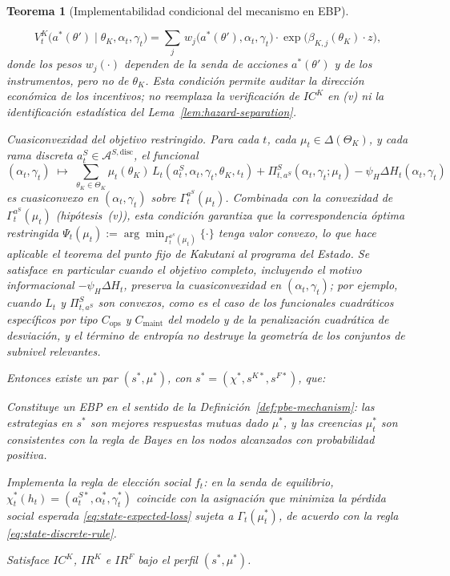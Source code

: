 \documentclass[review,authoryear,12pt]{elsarticle}
\theoremstyle{plain}
\newtheorem{theorem}{Teorema}
\theoremstyle{definition}
\newcommand{\ThetaK}{\Theta_K}
\newcommand{\1}{\mathbf{1}}
\begin{document}
\begin{theorem}[Implementabilidad condicional del mecanismo en EBP]
\begin{list}{}
  \[
    V^K_t\!\bigl(a^\ast(\theta')\mid\theta_K,\alpha_t,\gamma_t\bigr)
    =
    \sum_{j}\,w_j\!\bigl(a^\ast(\theta'),\alpha_t,\gamma_t\bigr)
    \cdot\exp\!\bigl(\beta_{K,j}(\theta_K)\cdot z\bigr),
  \]
  donde los pesos $w_j(\cdot)$ dependen de la senda de acciones $a^\ast(\theta')$ y de los instrumentos, pero no de $\theta_K$. Esta condición permite auditar la dirección económica de los incentivos; no reemplaza la verificación de $IC^K$ en \textup{(v)} ni la identificación estadística del Lema~\ref{lem:hazard-separation}.
  \item[\textup{(vii)}] Cuasiconvexidad del objetivo restringido. Para cada $t$, cada $\mu_t\in\Delta(\ThetaK)$, y cada rama discreta $a_t^S\in\mathcal{A}^{S,\mathrm{disc}}$, el funcional
  \[
  (\alpha_t,\gamma_t)\;\mapsto\;\sum_{\theta_K\in\ThetaK}\mu_t(\theta_K)\,L_t(a_t^S,\alpha_t,\gamma_t,\theta_K,\iota_t)
  +\Pi_{t,a^S}^S(\alpha_t,\gamma_t;\mu_t)
  -\psi_H\Delta H_t(\alpha_t,\gamma_t)
  \]
  es cuasiconvexo en $(\alpha_t,\gamma_t)$ sobre $\Gamma_t^{a^S}(\mu_t)$. Combinada con la convexidad de $\Gamma_t^{a^S}(\mu_t)$ \textup{(}hipótesis~\textup{(v)}\textup{)}, esta condición garantiza que la correspondencia óptima restringida $\Psi_t(\mu_t):=\arg\min_{\Gamma_t^{a^S}(\mu_t)}\{\cdot\}$ tenga valor convexo, lo que hace aplicable el teorema del punto fijo de Kakutani al programa del Estado. Se satisface en particular cuando el objetivo completo, incluyendo el motivo informacional $-\psi_H\Delta H_t$, preserva la cuasiconvexidad en $(\alpha_t,\gamma_t)$; por ejemplo, cuando $L_t$ y $\Pi_{t,a^S}^S$ son convexos, como es el caso de los funcionales cuadráticos específicos por tipo $C_{\mathrm{ops}}$ y $C_{\mathrm{maint}}$ del modelo y de la penalización cuadrática de desviación, y el término de entropía no destruye la geometría de los conjuntos de subnivel relevantes.
\end{list}

Entonces existe un par $(s^\ast,\mu^\ast)$, con $s^\ast=({\chi}^\ast,s^{K\ast},s^{F\ast})$, que:
\begin{list}{}{\setlength{\labelwidth}{2.0em}\setlength{\labelsep}{0.7em}\setlength{\leftmargin}{2.7em}\setlength{\itemindent}{0pt}\setlength{\listparindent}{0pt}\setlength{\parsep}{0pt}\setlength{\itemsep}{0.25\baselineskip}}
    \item[\textup{(a)}] Constituye un EBP en el sentido de la Definición~\ref{def:pbe-mechanism}: las estrategias en $s^\ast$ son mejores respuestas mutuas dado $\mu^\ast$, y las creencias $\mu_t^\ast$ son consistentes con la regla de Bayes en los nodos alcanzados con probabilidad positiva.
    \item[\textup{(b)}] Implementa la regla de elección social $f_t$: en la senda de equilibrio, $\chi_t^\ast(h_t)=(a_t^{S\ast},\alpha_t^\ast,\gamma_t^\ast)$ coincide con la asignación que minimiza la pérdida social esperada \eqref{eq:state-expected-loss} sujeta a $\Gamma_t(\mu_t^\ast)$, de acuerdo con la regla \eqref{eq:state-discrete-rule}.
    \item[\textup{(c)}] Satisface $IC^K$, $IR^K$ e $IR^F$ bajo el perfil $(s^\ast,\mu^\ast)$.
\end{list}
\end{theorem}
\end{document}
